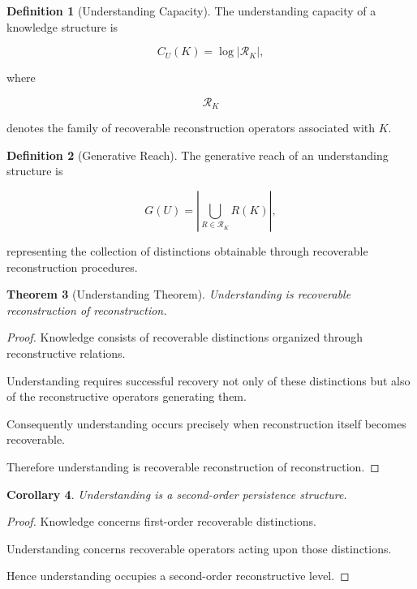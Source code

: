 \documentclass[12pt,oneside]{article}
\newtheorem{theorem}{Theorem}[section] \newtheorem{lemma}[theorem]{Lemma} \newtheorem{proposition}[theorem]{Proposition} \newtheorem{corollary}[theorem]{Corollary}
\theoremstyle{definition}
\newtheorem{definition}[theorem]{Definition} \newtheorem{axiom}[theorem]{Axiom} \newtheorem{remark}[theorem]{Remark} \newtheorem{example}[theorem]{Example}
\begin{document}
\begin{definition}[Understanding Capacity]

The understanding capacity of a knowledge structure is

\[
C_U(K)
=
\log |\mathcal R_K|,
\]

where

\[
\mathcal R_K
\]

denotes the family of recoverable reconstruction operators associated with \(K\).

\end{definition}

\begin{definition}[Generative Reach]

The generative reach of an understanding structure is

\[
G(U)
=
\left|
\bigcup_{R\in\mathcal R_K}
R(K)
\right|,
\]

representing the collection of distinctions obtainable through recoverable reconstruction procedures.

\end{definition}

\begin{theorem}[Understanding Theorem]

Understanding is recoverable reconstruction of reconstruction.

\end{theorem}

\begin{proof}

Knowledge consists of recoverable distinctions organized through reconstructive relations.

Understanding requires successful recovery not only of these distinctions but also of the reconstructive operators generating them.

Consequently understanding occurs precisely when reconstruction itself becomes recoverable.

Therefore understanding is recoverable reconstruction of reconstruction.

\end{proof}

\begin{corollary}

Understanding is a second-order persistence structure.

\end{corollary}

\begin{proof}

Knowledge concerns first-order recoverable distinctions.

Understanding concerns recoverable operators acting upon those distinctions.

Hence understanding occupies a second-order reconstructive level.

\end{proof}
\end{document}

